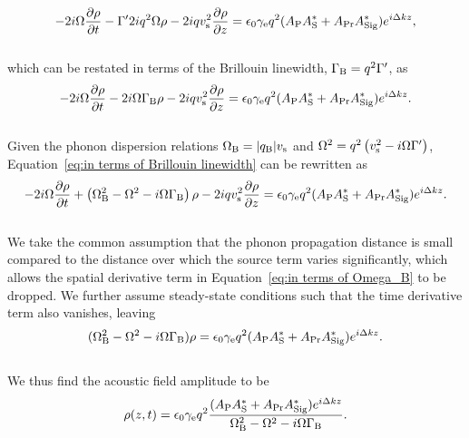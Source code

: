 \\
\begin{equation}
    -2i\Omega\frac{\partial\rho}{\partial t} - \Gamma^{\prime}2iq^{2}\Omega\rho - 2iqv_{\rm s}^{2}\frac{\partial\rho}{\partial z} = \epsilon_{0}\gamma_{\rm e}q^{2}(A_{\rm P}A_{\rm S}^{*} + A_{\rm Pr}A_{\rm Sig}^{*})e^{i\Delta kz},
\end{equation}
\\
which can be restated in terms of the Brillouin linewidth, \(\Gamma_{\rm B} = q^{2}\Gamma^{\prime}\), as
\\
\begin{equation}
    -2i\Omega\frac{\partial\rho}{\partial t} - 2i\Omega\Gamma_{\rm B}\rho - 2iqv_{\rm s}^{2}\frac{\partial\rho}{\partial z} = \epsilon_{0}\gamma_{\rm e}q^{2}(A_{\rm P}A_{\rm S}^{*} + A_{\rm Pr}A_{\rm Sig}^{*})e^{i\Delta kz}.
    \label{eq:in terms of Brillouin linewidth}
\end{equation}
\\
Given the phonon dispersion relations \(\Omega_{\rm B} = |q_{\rm B}|v_{\rm s}\) and \(\Omega^{2} = q^{2}\left(v_{\rm s}^{2} - i\Omega\Gamma^{\prime}\right)\), Equation~\ref{eq:in terms of Brillouin linewidth} can be rewritten as
\\
\begin{equation}
    -2i\Omega\frac{\partial\rho}{\partial t} + \left(\Omega_{\rm B}^{2} - \Omega^{2} - i\Omega\Gamma_{\rm B}\right)\rho - 2iqv_{\rm s}^{2}\frac{\partial\rho}{\partial z} = \epsilon_{0}\gamma_{\rm e}q^{2}(A_{\rm P}A_{\rm S}^{*} + A_{\rm Pr}A_{\rm Sig}^{*})e^{i\Delta kz}.
    \label{eq:in terms of Omega_B}
\end{equation}
\\
We take the common assumption that the phonon propagation distance is small compared to the distance over which the source term varies significantly, which allows the spatial derivative term in Equation~\ref{eq:in terms of Omega_B} to be dropped. We further assume steady-state conditions such that the time derivative term also vanishes, leaving
\\
\begin{equation}
    (\Omega^{2}_{\rm B} - \Omega^{2} - i\Omega\Gamma_{\rm B})\rho = \epsilon_{0}\gamma_{\rm e}q^{2}(A_{\rm P}A_{\rm S}^{*} + A_{\rm Pr}A_{\rm Sig}^{*})e^{i\Delta kz}.
\end{equation}
\\
We thus find the acoustic field amplitude to be
\\
\begin{equation}
    \rho(z,t) = \epsilon_{0}\gamma_{\rm e}q^{2}\frac{(A_{\rm P}A_{\rm S}^{*} + A_{\rm Pr}A_{\rm Sig}^{*})e^{i\Delta kz}}{\Omega_{\rm B}^{2} - \Omega^{2} - i\Omega\Gamma_{\rm B}}.
    \label{eq:Acoustic field amplitude}
\end{equation}


